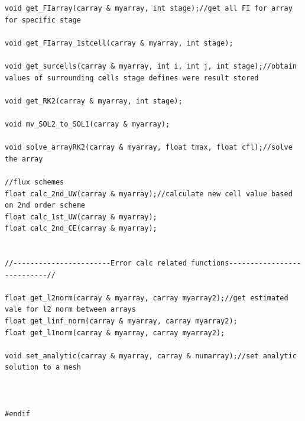 \documentclass[paper=a4, fontsize=11pt, abstract=on]{scrartcl}
\numberwithin{equation}{section}		%
\numberwithin{figure}{section}			%
\numberwithin{table}{section}				%
\begin{document}
\begin{lstlisting}
void get_FIarray(carray & myarray, int stage);//get all FI for array for specific stage

void get_FIarray_1stcell(carray & myarray, int stage);

void get_surcells(carray & myarray, int i, int j, int stage);//obtain values of surrounding cells stage defines were result stored

void get_RK2(carray & myarray, int stage);

void mv_SOL2_to_SOL1(carray & myarray);

void solve_arrayRK2(carray & myarray, float tmax, float cfl);//solve the array

//flux schemes
float calc_2nd_UW(carray & myarray);//calculate new cell value based on 2nd order scheme
float calc_1st_UW(carray & myarray);
float calc_2nd_CE(carray & myarray);


//-----------------------Error calc related functions---------------------------//

float get_l2norm(carray & myarray, carray myarray2);//get estimated vale for l2 norm between arrays
float get_linf_norm(carray & myarray, carray myarray2);
float get_l1norm(carray & myarray, carray myarray2);

void set_analytic(carray & myarray, carray & numarray);//set analytic solution to a mesh



#endif

\end{lstlisting}
\end{document}
